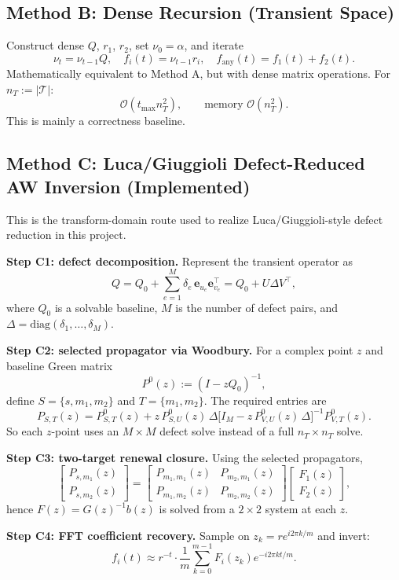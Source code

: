 \documentclass[11pt,a4paper]{article}
\begin{document}
\subsection{Method B: Dense Recursion (Transient Space)}
Construct dense $Q$, $r_1$, $r_2$, set $\nu_0=\alpha$, and iterate
\[
\nu_t=\nu_{t-1}Q,\quad f_i(t)=\nu_{t-1}r_i,\quad f_{\mathrm{any}}(t)=f_1(t)+f_2(t).
\]
Mathematically equivalent to Method A, but with dense matrix operations.
For $n_T:=|\mathcal T|$:
\[
\mathcal O(t_{\max}n_T^2),\qquad \text{memory } \mathcal O(n_T^2).
\]
This is mainly a correctness baseline.

\subsection{Method C: Luca/Giuggioli Defect-Reduced AW Inversion (Implemented)}
This is the transform-domain route used to realize Luca/Giuggioli-style defect reduction in this project.

\textbf{Step C1: defect decomposition.}
Represent the transient operator as
\[
Q=Q_0+\sum_{e=1}^{M}\delta_e\,\mathbf e_{u_e}\mathbf e_{v_e}^{\top}
=Q_0+U\Delta V^\top,
\]
where $Q_0$ is a solvable baseline, $M$ is the number of defect pairs, and
$\Delta=\mathrm{diag}(\delta_1,\dots,\delta_M)$.

\textbf{Step C2: selected propagator via Woodbury.}
For a complex point $z$ and baseline Green matrix
\[
P^0(z):=(I-zQ_0)^{-1},
\]
define $S=\{s,m_1,m_2\}$ and $T=\{m_1,m_2\}$. The required entries are
\[
P_{S,T}(z)
=P^0_{S,T}(z)
+z\,P^0_{S,U}(z)\,\Delta
\bigl[I_M-z\,P^0_{V,U}(z)\,\Delta\bigr]^{-1}
P^0_{V,T}(z).
\]
So each $z$-point uses an $M\times M$ defect solve instead of a full $n_T\times n_T$ solve.

\textbf{Step C3: two-target renewal closure.}
Using the selected propagators,
\[
\begin{bmatrix}
P_{s,m_1}(z)\\
P_{s,m_2}(z)
\end{bmatrix}
=
\begin{bmatrix}
P_{m_1,m_1}(z) & P_{m_2,m_1}(z)\\
P_{m_1,m_2}(z) & P_{m_2,m_2}(z)
\end{bmatrix}
\begin{bmatrix}
F_1(z)\\
F_2(z)
\end{bmatrix},
\]
hence $F(z)=G(z)^{-1}b(z)$ is solved from a $2\times2$ system at each $z$.

\textbf{Step C4: FFT coefficient recovery.}
Sample on $z_k=r e^{i2\pi k/m}$ and invert:
\[
 f_i(t)\approx r^{-t}\cdot\frac{1}{m}\sum_{k=0}^{m-1}F_i(z_k)e^{-i2\pi kt/m}.
\]
\end{document}
